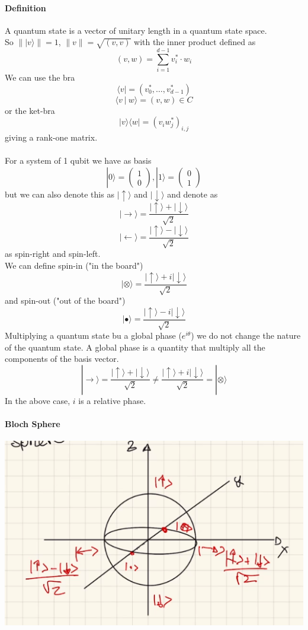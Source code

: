 \documentclass[10pt]{report}
\begin{document}
\paragraph{Definition} A quantum state is a vector of unitary length in a quantum state space.\\
So $\| |v\rangle\| = 1$, $\|v\|=\sqrt{(v,v)}$ with the inner product defined as
$$(v,w)=\sum_{i=1}^{d-1}v_i^*\cdot w_i$$
We can use the bra $$\langle v| = (v_0^*,\ldots,v_{d-1}^*)$$
$$\langle v\:|\:w\rangle = (v,w)\in C$$
or the ket-bra $$|v\rangle\langle w| = (v_iw_j^*)_{i,j}$$ giving a rank-one matrix.
\paragraph{} For a system of 1 qubit we have as basis $$|0\rangle = \left(\begin{array}{c}
1\\0
\end{array}\right), |1\rangle=\left(\begin{array}{c}
0\\1
\end{array}\right)$$ but we can also denote this as $|\uparrow\rangle$ and $|\downarrow\rangle$ and denote as $$|\rightarrow\rangle = \frac{|\uparrow\rangle + |\downarrow\rangle}{\sqrt{2}}$$
$$|\leftarrow\rangle = \frac{|\uparrow\rangle - |\downarrow\rangle}{\sqrt{2}}$$
as spin-right and spin-left.\\
We can define spin-in ("in the board")
$$|\otimes\rangle = \frac{|\uparrow\rangle + i|\downarrow\rangle}{\sqrt{2}}$$
and spin-out ("out of the board")
$$|\bullet\rangle = \frac{|\uparrow\rangle - i|\downarrow\rangle}{\sqrt{2}}$$
Multiplying a quantum state bu a global phase ($e^{i\theta}$) we do not change the nature of the quantum state. A global phase is a quantity that multiply all the components of the basis vector.
$$|\rightarrow\rangle = \frac{|\uparrow\rangle + |\downarrow\rangle}{\sqrt{2}} \neq \frac{|\uparrow\rangle + i|\downarrow\rangle}{\sqrt{2}} = |
\otimes\rangle$$
In the above case, $i$ is a relative phase.
\paragraph{Bloch Sphere} %
\begin{center}
	\includegraphics[scale=0.5]{11.png}
\end{center}
\end{document}
